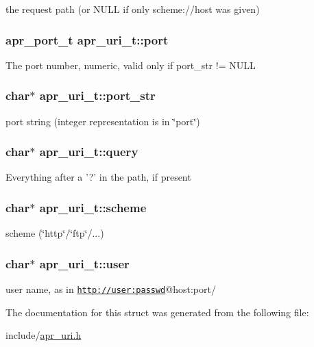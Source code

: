 the request path (or N\-U\-L\-L if only scheme\-://host was given) \hypertarget{structapr__uri__t_a6e6e858ce56b5d58389287c1cc1134fa}{
\subsubsection[{port}]{\setlength{\rightskip}{0pt plus 5cm}apr\-\_\-port\-\_\-t apr\-\_\-uri\-\_\-t\-::port}}\label{structapr__uri__t_a6e6e858ce56b5d58389287c1cc1134fa}
The port number, numeric, valid only if port\-\_\-str != N\-U\-L\-L \hypertarget{structapr__uri__t_ad9d69051e1fb3f3709260c3c3c014012}{
\subsubsection[{port\-\_\-str}]{\setlength{\rightskip}{0pt plus 5cm}char$\ast$ apr\-\_\-uri\-\_\-t\-::port\-\_\-str}}\label{structapr__uri__t_ad9d69051e1fb3f3709260c3c3c014012}
port string (integer representation is in \char`\"{}port\char`\"{}) \hypertarget{structapr__uri__t_a88d889bcda9e95696022f04ffb470678}{
\subsubsection[{query}]{\setlength{\rightskip}{0pt plus 5cm}char$\ast$ apr\-\_\-uri\-\_\-t\-::query}}\label{structapr__uri__t_a88d889bcda9e95696022f04ffb470678}
Everything after a '?' in the path, if present \hypertarget{structapr__uri__t_a5d62fa370265b6bc956aa86d36024a5d}{
\subsubsection[{scheme}]{\setlength{\rightskip}{0pt plus 5cm}char$\ast$ apr\-\_\-uri\-\_\-t\-::scheme}}\label{structapr__uri__t_a5d62fa370265b6bc956aa86d36024a5d}
scheme (\char`\"{}http\char`\"{}/\char`\"{}ftp\char`\"{}/...) \hypertarget{structapr__uri__t_a2b763f50bec4fda0cf67e5238275b5fd}{
\subsubsection[{user}]{\setlength{\rightskip}{0pt plus 5cm}char$\ast$ apr\-\_\-uri\-\_\-t\-::user}}\label{structapr__uri__t_a2b763f50bec4fda0cf67e5238275b5fd}
user name, as in \href{http://user:passwd}{\tt http\-://user\-:passwd}@host\-:port/ 

The documentation for this struct was generated from the following file\-:\begin{DoxyCompactItemize}
\item 
include/\hyperlink{apr__uri_8h}{apr\-\_\-uri.\-h}\end{DoxyCompactItemize}
